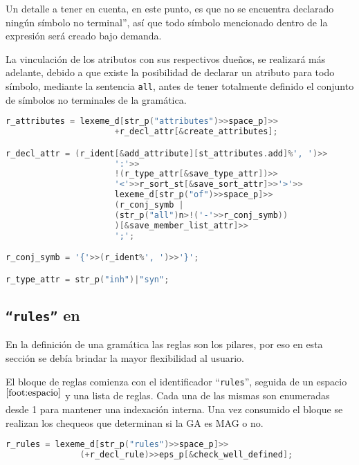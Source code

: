 Un detalle a tener en cuenta, en este punto, es que no se encuentra declarado ningún símbolo no terminal'', así que todo símbolo mencionado dentro de la expresión será creado bajo demanda.

La vinculación de los atributos con sus respectivos dueños, se realizará más adelante, debido a que existe la posibilidad de declarar un atributo para todo símbolo, mediante la sentencia \texttt{all}, antes de tener totalmente definido el conjunto de símbolos no terminales de la gramática.

\begin{lstlisting}[language=C++, basicstyle=\scriptsize, columns=fullflexible, linewidth=11cm]
r_attributes = lexeme_d[str_p("attributes")>>space_p]>>
                      +r_decl_attr[&create_attributes];

r_decl_attr = (r_ident[&add_attribute][st_attributes.add]%', ')>>
                      ':'>>
                      !(r_type_attr[&save_type_attr])>>
                      '<'>>r_sort_st[&save_sort_attr]>>'>'>>
                      lexeme_d[str_p("of")>>space_p]>>
                      (r_conj_symb |
                      (str_p("all")n>!('-'>>r_conj_symb))
                      )[&save_member_list_attr]>>
                      ';';

r_conj_symb = '{'>>(r_ident%', ')>>'}';

r_type_attr = str_p("inh")|"syn";
\end{lstlisting}

\subsection{\texttt{``rules''} en \spirit}

En la definición de una gramática las reglas son los pilares, por eso en esta sección se debía brindar la mayor flexibilidad al usuario.

El bloque de reglas comienza con el identificador ``\texttt{rules}'', seguida de un espacio$^{\ref{foot:espacio}}$ y una lista de reglas. Cada una de las mismas son enumeradas desde 1 para mantener una indexación interna. Una vez consumido el bloque se realizan los chequeos que determinan si la GA es MAG o no.

\begin{lstlisting}[language=C++, basicstyle=\scriptsize, columns=fullflexible, linewidth=9cm]
r_rules = lexeme_d[str_p("rules")>>space_p]>>
               (+r_decl_rule)>>eps_p[&check_well_defined];
\end{lstlisting}

